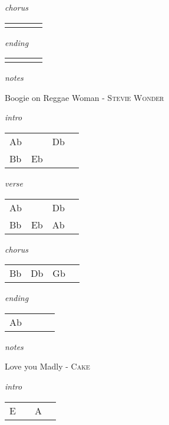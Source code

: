 \documentclass[12pt]{article}
\begin{document}
\textit{chorus}

\begin{tabular}{|P{1.25in}|P{1.25in}|P{1.25in}|P{1.25in}|}
    &   &   &   \\
\end{tabular}

\textit{ending}

\begin{tabular}{|P{1.25in}|P{1.25in}|P{1.25in}|P{1.25in}|}
    &   &   &   \\
\end{tabular}

\textit{notes}

\newpage

{\Huge Boogie on Reggae Woman} {\huge - \textsc{Stevie Wonder}}

\huge
\textit{intro}

\begin{tabular}{|P{1.25in}|P{1.25in}|P{1.25in}|P{1.25in}|}
  Ab &     & Db  &   \\
  Bb & Eb  &
\end{tabular}

\textit{verse}

\begin{tabular}{|P{1.25in}|P{1.25in}|P{1.25in}|P{1.25in}|}
  Ab &   &  Db &   \\
  Bb  & Eb  & Ab &  \\
\end{tabular}

\textit{chorus}

\begin{tabular}{|P{1.25in}|P{1.25in}|P{1.25in}|P{1.25in}|}
  Bb & Db  & Gb  &   \\
\end{tabular}

\textit{ending}

\begin{tabular}{|P{1.25in}|P{1.25in}|P{1.25in}|P{1.25in}|}
  Ab &   &   &   \\
\end{tabular}

\textit{notes}

\newpage

{\Huge Love you Madly} {\huge - \textsc{Cake}}

\huge
\textit{intro}

\begin{tabular}{|P{1.25in}|P{1.25in}|P{1.25in}|P{1.25in}|}
  E &   & A  &   \\
\end{tabular}
\end{document}
